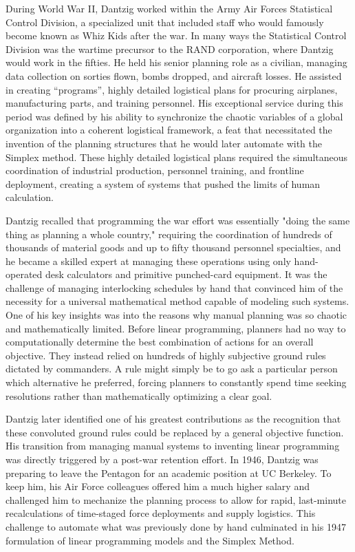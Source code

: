 During World War II, Dantzig worked within the Army Air Forces Statistical Control Division, a specialized unit that included staff who would famously become known as Whiz Kids after the war. In many ways the Statistical Control Division was the wartime precursor to the RAND corporation, where Dantzig would work in the fifties. He held his senior planning role as a civilian, managing data collection on sorties flown, bombs dropped, and aircraft losses. He assisted in creating “programs”, highly detailed logistical plans for procuring airplanes, manufacturing parts, and training personnel. His exceptional service during this period was defined by his ability to synchronize the chaotic variables of a global organization into a coherent logistical framework, a feat that necessitated the invention of the planning structures that he would later automate with the Simplex method. These highly detailed logistical plans required the simultaneous coordination of industrial production, personnel training, and frontline deployment, creating a system of systems that pushed the limits of human calculation. \cite{dantzigReminiscencesOriginsLinear1982} \cite{byrneWhizKidsFounding1993}

Dantzig recalled that programming the war effort was essentially "doing the same thing as planning a whole country," requiring the coordination of hundreds of thousands of material goods and up to fifty thousand personnel specialties, and he became a skilled expert at managing these operations using only hand-operated desk calculators and primitive punched-card equipment. It was the challenge of managing interlocking schedules by hand that convinced him of the necessity for a universal mathematical method capable of modeling such systems. One of his key insights was into the reasons why manual planning was so chaotic and mathematically limited. Before linear programming, planners had no way to computationally determine the best combination of actions for an overall objective. They instead relied on hundreds of highly subjective ground rules dictated by commanders. A rule might simply be to go ask a particular person which alternative he preferred, forcing planners to constantly spend time seeking resolutions rather than mathematically optimizing a clear goal. 

Dantzig later identified one of his greatest contributions as the recognition that these convoluted ground rules could be replaced by a general objective function. His transition from managing manual systems to inventing linear programming was directly triggered by a post-war retention effort. In 1946, Dantzig was preparing to leave the Pentagon for an academic position at UC Berkeley. To keep him, his Air Force colleagues offered him a much higher salary and challenged him to mechanize the planning process to allow for rapid, last-minute recalculations of time-staged force deployments and supply logistics. This challenge to automate what was previously done by hand culminated in his 1947 formulation of linear programming models and the Simplex Method.

